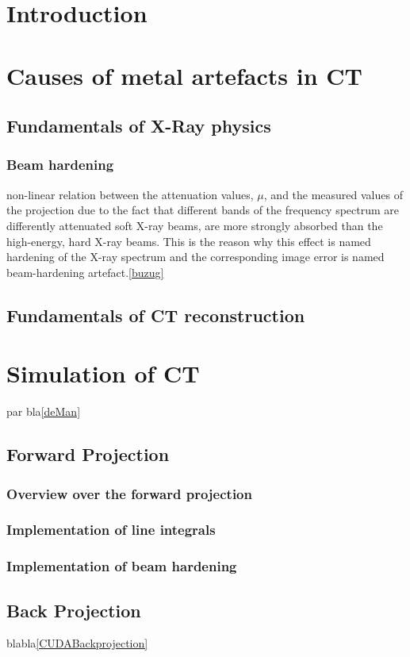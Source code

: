 \chapter{Introduction}

\chapter{Causes of metal artefacts in CT}
\section{Fundamentals of X-Ray physics}
\subsection{Beam hardening}
non-linear relation between the attenuation values, \(\mu\), and the measured values of the projection
due to the fact that different bands of the frequency spectrum are differently attenuated
soft X-ray beams, are more strongly absorbed than the high-energy, hard X-ray beams. This is the reason why this effect is named hardening of the X-ray spectrum and the corresponding image error is named beam-hardening artefact.\ref{buzug}
\section{Fundamentals of CT reconstruction}

\chapter{Simulation of CT}
par bla\ref{deMan}
\section{Forward Projection}
\subsection{Overview over the forward projection}
\subsection{Implementation of line integrals}
\subsection{Implementation of beam hardening}
\section{Back Projection}
blabla\ref{CUDABackprojection}
